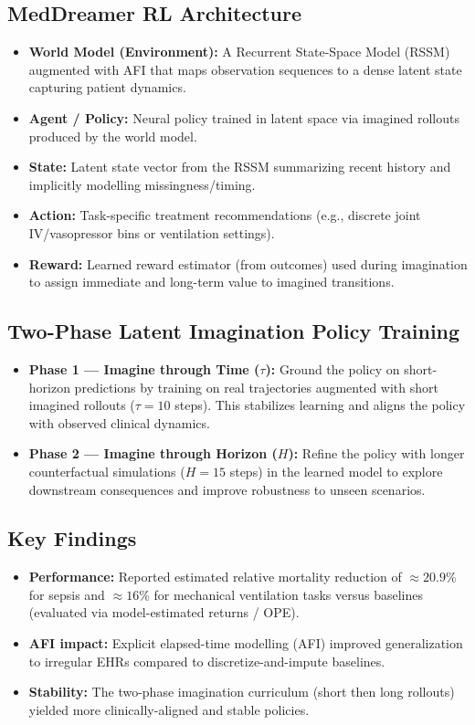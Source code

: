 \subsection*{MedDreamer RL Architecture}
\begin{itemize}
    \item \textbf{World Model (Environment):} A Recurrent State-Space Model (RSSM) augmented with AFI that maps observation sequences to a dense latent state capturing patient dynamics.
    \item \textbf{Agent / Policy:} Neural policy trained in latent space via imagined rollouts produced by the world model.
    \item \textbf{State:} Latent state vector from the RSSM summarizing recent history and implicitly modelling missingness/timing.
    \item \textbf{Action:} Task-specific treatment recommendations (e.g., discrete joint IV/vasopressor bins or ventilation settings).
    \item \textbf{Reward:} Learned reward estimator (from outcomes) used during imagination to assign immediate and long-term value to imagined transitions.
\end{itemize}

\subsection*{Two-Phase Latent Imagination Policy Training}
\begin{itemize}
    \item \textbf{Phase 1 — Imagine through Time ($\tau$):} Ground the policy on short-horizon predictions by training on real trajectories augmented with short imagined rollouts (\(\tau=10\) steps). This stabilizes learning and aligns the policy with observed clinical dynamics.
    \item \textbf{Phase 2 — Imagine through Horizon ($H$):} Refine the policy with longer counterfactual simulations (\(H=15\) steps) in the learned model to explore downstream consequences and improve robustness to unseen scenarios.
\end{itemize}

\subsection*{Key Findings}
\begin{itemize}
    \item \textbf{Performance:} Reported estimated relative mortality reduction of \(\approx20.9\%\) for sepsis and \(\approx16\%\) for mechanical ventilation tasks versus baselines (evaluated via model-estimated returns / OPE).
    \item \textbf{AFI impact:} Explicit elapsed-time modelling (AFI) improved generalization to irregular EHRs compared to discretize-and-impute baselines.
    \item \textbf{Stability:} The two-phase imagination curriculum (short then long rollouts) yielded more clinically-aligned and stable policies.
\end{itemize}

